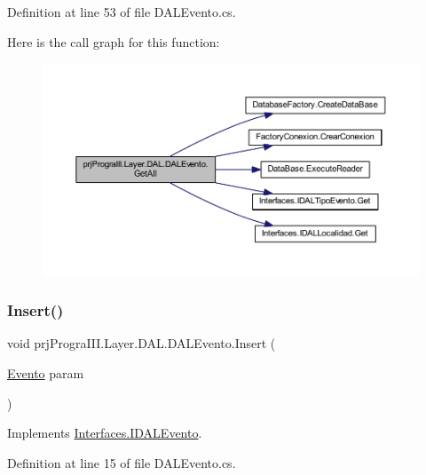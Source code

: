 Definition at line 53 of file D\+A\+L\+Evento.\+cs.

Here is the call graph for this function\+:
\nopagebreak
\begin{figure}[H]
\begin{center}
\leavevmode
\includegraphics[width=350pt]{classprj_progra_i_i_i_1_1_layer_1_1_d_a_l_1_1_d_a_l_evento_a513523b7c4cb6204629239b3c06c3baa_cgraph}
\end{center}
\end{figure}
\hypertarget{classprj_progra_i_i_i_1_1_layer_1_1_d_a_l_1_1_d_a_l_evento_a0bc4cec389945eb6f5f796c63616d032}{}\label{classprj_progra_i_i_i_1_1_layer_1_1_d_a_l_1_1_d_a_l_evento_a0bc4cec389945eb6f5f796c63616d032} 
\subsubsection{\texorpdfstring{Insert()}{Insert()}}
{\footnotesize\ttfamily void prj\+Progra\+I\+I\+I.\+Layer.\+D\+A\+L.\+D\+A\+L\+Evento.\+Insert (\begin{DoxyParamCaption}\item[{\hyperlink{classprj_progra_i_i_i_1_1_layer_1_1_entities_1_1_evento}{Evento}}]{param }\end{DoxyParamCaption})}



Implements \hyperlink{interface_interfaces_1_1_i_d_a_l_evento_a52962146e03ae6b9b86e487e01640832}{Interfaces.\+I\+D\+A\+L\+Evento}.



Definition at line 15 of file D\+A\+L\+Evento.\+cs.

